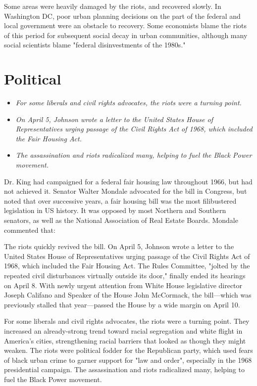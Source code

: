 Some areas were heavily damaged by the riots, and recovered slowly. In
Washington DC, poor urban planning decisions on the part of the federal
and local government were an obstacle to recovery. Some economists blame
the riots of this period for subsequent social decay in urban
communities, although many social scientists blame "federal
disinvestments of the 1980s."

\section{Political}\label{political}

\begin{itemize}
\item
  \emph{For some liberals and civil rights advocates, the riots were a
  turning point.}
\item
  \emph{On April 5, Johnson wrote a letter to the United States House of
  Representatives urging passage of the Civil Rights Act of 1968, which
  included the Fair Housing Act.}
\item
  \emph{The assassination and riots radicalized many, helping to fuel
  the Black Power movement.}
\end{itemize}

Dr. King had campaigned for a federal fair housing law throughout 1966,
but had not achieved it. Senator Walter Mondale advocated for the bill
in Congress, but noted that over successive years, a fair housing bill
was the most filibustered legislation in US history. It was opposed by
most Northern and Southern senators, as well as the National Association
of Real Estate Boards. Mondale commented that:

The riots quickly revived the bill. On April 5, Johnson wrote a letter
to the United States House of Representatives urging passage of the
Civil Rights Act of 1968, which included the Fair Housing Act. The Rules
Committee, "jolted by the repeated civil disturbances virtually outside
its door," finally ended its hearings on April 8. With newly urgent
attention from White House legislative director Joseph Califano and
Speaker of the House John McCormack, the bill---which was previously
stalled that year---passed the House by a wide margin on April 10.

For some liberals and civil rights advocates, the riots were a turning
point. They increased an already-strong trend toward racial segregation
and white flight in America's cities, strengthening racial barriers that
looked as though they might weaken. The riots were political fodder for
the Republican party, which used fears of black urban crime to garner
support for "law and order", especially in the 1968 presidential
campaign. The assassination and riots radicalized many, helping to fuel
the Black Power movement.

